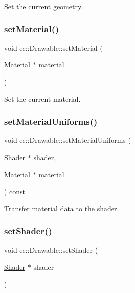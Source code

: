 Set the current geometry. \mbox{\label{classec_1_1_drawable_a0fc7868639a83830d4b60dfad85a0826}} 
\subsubsection{\texorpdfstring{set\+Material()}{setMaterial()}}
{\footnotesize\ttfamily void ec\+::\+Drawable\+::set\+Material (\begin{DoxyParamCaption}\item[{\mbox{\hyperlink{classec_1_1_material}{Material}} $\ast$}]{material }\end{DoxyParamCaption})}

Set the current material. \mbox{\label{classec_1_1_drawable_a94739c3f22a3f52edb0a7213d4b16907}} 
\subsubsection{\texorpdfstring{set\+Material\+Uniforms()}{setMaterialUniforms()}}
{\footnotesize\ttfamily void ec\+::\+Drawable\+::set\+Material\+Uniforms (\begin{DoxyParamCaption}\item[{\mbox{\hyperlink{classec_1_1_shader}{Shader}} $\ast$}]{shader,  }\item[{\mbox{\hyperlink{classec_1_1_material}{Material}} $\ast$}]{material }\end{DoxyParamCaption}) const\hspace{0.3cm}{\ttfamily [protected]}}

Transfer material data to the shader. \mbox{\label{classec_1_1_drawable_a413f373bb2cba109497377e18b084048}} 
\subsubsection{\texorpdfstring{set\+Shader()}{setShader()}}
{\footnotesize\ttfamily void ec\+::\+Drawable\+::set\+Shader (\begin{DoxyParamCaption}\item[{\mbox{\hyperlink{classec_1_1_shader}{Shader}} $\ast$}]{shader }\end{DoxyParamCaption})}

